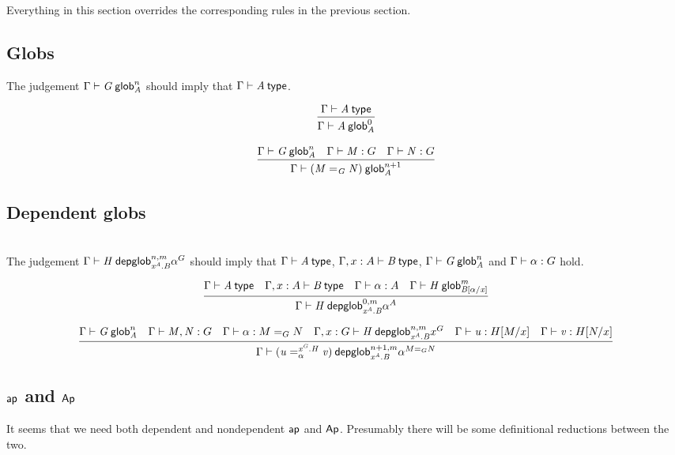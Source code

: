 Everything in this section overrides the corresponding rules in the previous
section.

\subsection{Globs}

The judgement $\text{\ensuremath{\Gamma}} \vdash \mathit{G} \: \mathsf{glob}^{n}_{\mathit{A}}$ should imply that
$\text{\ensuremath{\Gamma}} \vdash \mathit{A} \: \mathsf{type}$.

\begin{small}
  \[\infer{\wfglob{\Gamma}{A}{0}{A}} {\wftype{\Gamma}{A}}\]

  \[\infer{\wfglob{\Gamma}{(\homj{G}{M}{N})}{n+1}{A}} {\wfglob{\Gamma}{G}{n}{A}
    & \ofglob{\Gamma}{M}{G} & \ofglob{\Gamma}{N}{G}}\]
\end{small}

\subsection{Dependent globs}

\\

The judgement $\text{\ensuremath{\Gamma}} \vdash \mathit{H} \: \mathsf{depglob}^{n,m}_{\mathit{x^A.B}}\alpha^G$ should imply that
$\text{\ensuremath{\Gamma}} \vdash \mathit{A} \: \mathsf{type}$, $\text{\ensuremath{\Gamma,x:A}} \vdash \mathit{B} \: \mathsf{type}$, $\text{\ensuremath{\Gamma}} \vdash \mathit{G} \: \mathsf{glob}^{n}_{\mathit{A}}$ and
$\text{\ensuremath{\Gamma}} \vdash \mathit{\alpha} : {G}$ hold.

\begin{small}
  \[\infer{\wfdepglob{\Gamma}{H}{0,m}{x^A.B}\alpha^A}
  {\wftype{\Gamma}{A}
    & \wftype{\Gamma,x:A}{B}
    & \ofglob{\Gamma}{\alpha}{A}
    & \wfglob{\Gamma}{H}{m}{B[\alpha/x]}
  }\]

  \[\infer{\wfdepglob{\Gamma}{(\dhomj{x^G.H}{u}{v}{\alpha})}{n+1,m}
    {x^A.B}\alpha^{\homj{G}{M}{N}}} {\wfglob{\Gamma}{G}{n}{A} &
    \ofglob{\Gamma}{M,N}{G}
    & \ofglob{\Gamma}{\alpha}{\homj{G}{M}{N}} \\
    & \wfdepglob{\Gamma,x:G}{H}{n,m}{x^A.B}x^G & \ofglob{\Gamma}{u}{H[M/x]} &
    \ofglob{\Gamma}{v}{H[N/x]} }\]
\end{small}


\subsection{$\mathsf{ap}$ and $\mathsf{Ap}$}

It seems that we need both dependent and nondependent $\mathsf{ap}$ and
$\mathsf{Ap}$. Presumably there will be some definitional reductions between the
two.

